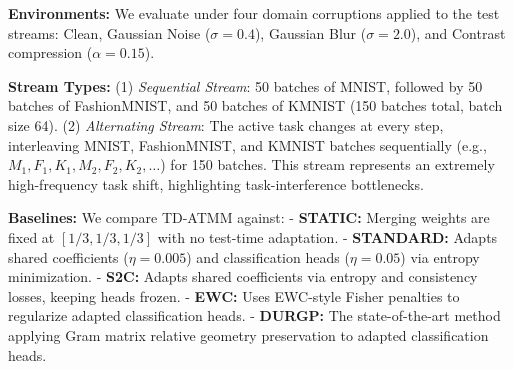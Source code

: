 \documentclass{article}
\theoremstyle{plain}
\theoremstyle{definition}
\theoremstyle{remark}
\begin{document}
\textbf{Environments:} We evaluate under four domain corruptions applied to the test streams: Clean, Gaussian Noise ($\sigma=0.4$), Gaussian Blur ($\sigma=2.0$), and Contrast compression ($\alpha=0.15$). 

\textbf{Stream Types:} 
(1) \emph{Sequential Stream}: 50 batches of MNIST, followed by 50 batches of FashionMNIST, and 50 batches of KMNIST (150 batches total, batch size 64).
(2) \emph{Alternating Stream}: The active task changes at every step, interleaving MNIST, FashionMNIST, and KMNIST batches sequentially (e.g., $M_1, F_1, K_1, M_2, F_2, K_2, \dots$) for 150 batches. This stream represents an extremely high-frequency task shift, highlighting task-interference bottlenecks.

\textbf{Baselines:} We compare TD-ATMM against:
- \textbf{STATIC:} Merging weights are fixed at $[1/3, 1/3, 1/3]$ with no test-time adaptation.
- \textbf{STANDARD:} Adapts shared coefficients ($\eta=0.005$) and classification heads ($\eta=0.05$) via entropy minimization.
- \textbf{S2C:} Adapts shared coefficients via entropy and consistency losses, keeping heads frozen.
- \textbf{EWC:} Uses EWC-style Fisher penalties to regularize adapted classification heads.
- \textbf{DURGP:} The state-of-the-art method applying Gram matrix relative geometry preservation to adapted classification heads.
\end{document}
